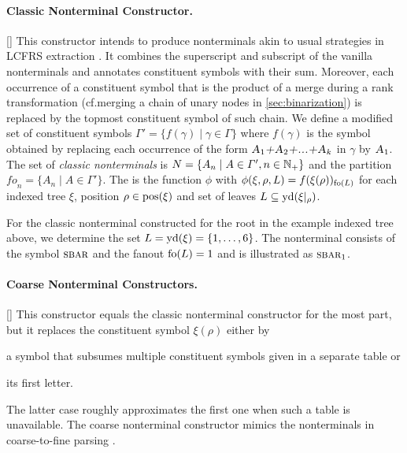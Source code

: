 \documentclass[../../document.tex]{subfiles}
\begin{document}
    \paragraph{Classic Nonterminal Constructor.}[]
    This constructor intends to produce nonterminals akin to usual strategies in LCFRS extraction \citep{MaierSogaard08}.
    It combines the superscript and subscript of the vanilla nonterminals and annotates constituent symbols with their sum.
    Moreover, each occurrence of a constituent symbol that is the product of a merge during a rank transformation (cf.\@ merging a chain of unary nodes in \cref{sec:binarization}) is replaced by the topmost constituent symbol of such chain.
    We define a modified set of constituent symbols \(\varGamma' = \{ f(\gamma) \mid \gamma \in \varGamma \}\) where \(f(\gamma)\) is the symbol obtained by replacing each occurrence of the form \(\textsc{\textsl{A$_1$+A$_2$+...+A$_k$}}\) in \(\gamma\) by \(\textsc{\textsl{A$_1$}}\).
    The set of \emph{classic nonterminals} is \(N = \{ A_n \mid A \in \varGamma', n \in \mathbb{N}_+ \}\) and the partition \(\mathit{fo}_n = \{A_n \mid A \in \varGamma'\}\).
    The  is the function \(\phi\) with \(\phi(\xi, \rho, L) = f(\xi(\rho))_{\operatorname{fo}(L)}\) for each indexed tree \(\xi\), position \(\rho \in \operatorname{pos}(\xi)\) and set of leaves \(L \subseteq \operatorname{yd}(\xi|_\rho)\).

    \begin{example}
    For the classic nonterminal constructed for the root in the example indexed tree above, we determine the set \(L = \operatorname{yd}(\xi) = \{1,\ldots,6\}\).
    The nonterminal consists of the symbol \(\textsc{sbar}\) and the fanout \(\operatorname{fo}(L) = 1\) and is illustrated as \(\textsc{sbar}_1\).
    \end{example}

    \paragraph{Coarse Nonterminal Constructors.}[]
    This constructor equals the classic nonterminal constructor for the most part, but it replaces the constituent symbol \(\xi(\rho)\) either by
    \begin{inparaenum}
        \item a symbol that subsumes multiple constituent symbols given in a separate table or
        \item its first letter.
    \end{inparaenum}
    The latter case roughly approximates the first one when such a table is unavailable.
    The coarse nonterminal constructor mimics the nonterminals in coarse-to-fine parsing \citep{Cha06,Tei17}.
\end{document}
